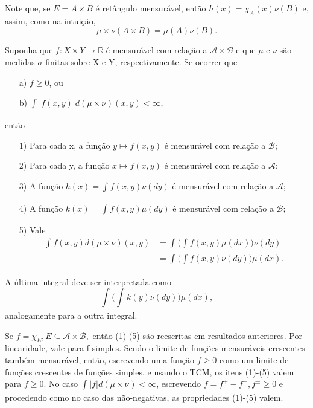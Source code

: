 \documentclass[measure_theory.tex]{subfiles}
\begin{document}
Note que, se \(E = A\times B\) é retângulo mensurável, então \(h(x) = \chi_{A}(x)\nu(B)\) e, assim, como na intuição,
\[
	\mu \times \nu(A\times B) = \mu (A) \nu(B).
\]
\hypertarget{fubini_tonelli}{
	\begin{theorem*}
		Suponha que \(f:X\times Y\rightarrow \mathbb{R}\) é mensurável com relação a \(\mathcal{A}\times \mathcal{B}\) e que \(\mu \) e \(\nu\) são medidas \(\sigma \)-finitas sobre X e Y, respectivamente. Se ocorrer que
		\begin{itemize}
			\item[a)] \(f\geq 0\), ou
			\item[b)] \(\int_{}|f(x, y)| d(\mu\times \nu_{})(x, y) < \infty,\)
		\end{itemize}
		então
		\begin{itemize}
			\item[1)] Para cada x, a função \(y\mapsto f(x, y)\) é mensurável com relação a \(\mathcal{B}\);
			\item[2)] Para cada y, a função \(x\mapsto f(x, y)\) é mensurável com relação a \(\mathcal{A}\);
			\item[3)] A função \(h(x) = \int_{}f(x, y)\nu( dy)\) é mensurável com relação a \(\mathcal{A}\);
			\item[4)] A função \(k(x) = \int_{}f(x, y)\mu( dy)\) é mensurável com relação a \(\mathcal{B}\);
			\item[5)] Vale
			      \begin{align*}
				      \int_{}f(x, y) d(\mu\times \nu)(x, y)_{} & = \int_{}\biggl(\int_{}^{}f(x, y)\mu (dx)\biggr) \nu(dy)    \\
				                                               & = \int_{}^{}\biggl(\int_{}^{}f(x, y)\nu(dy)\biggr)\mu (dx).
			      \end{align*}
		\end{itemize}
	\end{theorem*}}
A última integral deve ser interpretada como
\[
	\int_{}^{}\biggl(\int_{}^{}k(y)\nu(dy)\biggr)\mu (dx),
\]
analogamente para a outra integral.
\begin{proof*}
	Se \(f = \chi_{E}, E\subseteq \mathcal{A}\times \mathcal{B},\) então (1)-(5) são reescritas em resultados anteriores.
	Por linearidade, vale para f simples. Sendo o limite de funções mensuráveis crescentes também mensurável, então, escrevendo uma função \(f\geq 0\) como um limite de funções crescentes de funções
	simples, e usando o TCM, os itens (1)-(5) valem para \(f\geq 0\). No caso \(\int_{}|f| d(\mu\times\nu_{}) < \infty\), escrevendo \(f=f^{+}-f^{-}, f^{\pm}\geq 0\) e procedendo como no caso das não-negativas,
	as propriedades (1)-(5) valem. \qedsymbol
\end{proof*}
\end{document}
